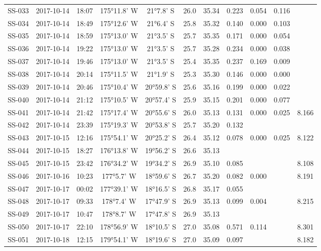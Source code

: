 \begin{longtable}{ccccccccccc}
  SS-033 & 2017-10-14 & 18:07 & 175°11.8' W & 21°7.8' S & 26.0 & 35.34 & 0.223 & 0.054 & 0.116 &  \\ 
  SS-034 & 2017-10-14 & 18:49 & 175°12.6' W & 21°6.4' S & 25.8 & 35.32 & 0.140 & 0.000 & 0.103 &  \\ 
  SS-035 & 2017-10-14 & 18:59 & 175°13.0' W & 21°3.5' S & 25.7 & 35.35 & 0.171 & 0.000 & 0.054 &  \\ 
  SS-036 & 2017-10-14 & 19:22 & 175°13.0' W & 21°3.5' S & 25.7 & 35.28 & 0.234 & 0.000 & 0.038 &  \\ 
  SS-037 & 2017-10-14 & 19:46 & 175°13.0' W & 21°3.5' S & 25.4 & 35.35 & 0.237 & 0.169 & 0.009 &  \\ 
  SS-038 & 2017-10-14 & 20:14 & 175°11.5' W & 21°1.9' S & 25.3 & 35.30 & 0.146 & 0.000 & 0.000 &  \\ 
  SS-039 & 2017-10-14 & 20:46 & 175°10.4' W & 20°59.8' S & 25.6 & 35.16 & 0.199 & 0.000 & 0.022 &  \\ 
  SS-040 & 2017-10-14 & 21:12 & 175°10.5' W & 20°57.4' S & 25.9 & 35.15 & 0.201 & 0.000 & 0.077 &  \\ 
  SS-041 & 2017-10-14 & 21:42 & 175°17.4' W & 20°55.6' S & 26.0 & 35.13 & 0.131 & 0.000 & 0.025 & 8.166 \\ 
  SS-042 & 2017-10-14 & 23:39 & 175°19.3' W & 20°53.8' S & 25.7 & 35.20 & 0.132 &  &  &  \\ 
  SS-043 & 2017-10-15 & 12:16 & 175°54.1' W & 20°25.2' S & 26.4 & 35.12 & 0.078 & 0.000 & 0.025 & 8.122 \\ 
  SS-044 & 2017-10-15 & 18:27 & 176°13.8' W & 19°56.2' S & 26.6 & 35.13 &  &  &  &  \\ 
  SS-045 & 2017-10-15 & 23:42 & 176°34.2' W & 19°34.2' S & 26.9 & 35.10 & 0.085 &  &  & 8.108 \\ 
  SS-046 & 2017-10-16 & 10:23 & 177°5.7' W & 18°59.6' S & 26.7 & 35.20 & 0.082 & 0.000 &  & 8.191 \\ 
  SS-047 & 2017-10-17 & 00:02 & 177°39.1' W & 18°16.5' S & 26.8 & 35.17 & 0.055 &  &  &  \\ 
  SS-048 & 2017-10-17 & 09:33 & 178°7.4' W & 17°47.9' S & 26.9 & 35.13 & 0.099 & 0.004 &  & 8.215 \\ 
  SS-049 & 2017-10-17 & 10:47 & 178°8.7' W & 17°47.8' S & 26.9 & 35.13 &  &  &  &  \\ 
  SS-050 & 2017-10-17 & 22:10 & 178°56.9' W & 18°10.5' S & 27.0 & 35.08 & 0.571 & 0.114 &  & 8.301 \\ 
  SS-051 & 2017-10-18 & 12:15 & 179°54.1' W & 18°19.6' S & 27.0 & 35.09 & 0.097 &  &  & 8.182 \\ 

\end{longtable}
